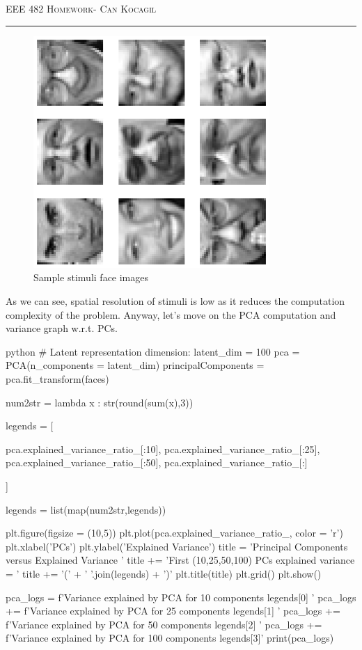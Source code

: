 \documentclass[12pt]{amsart}
\begin{document}
\newpage
{\scshape EEE 482} \hfill {\scshape \large  Homework-\relax} \hfill {\scshape Can Kocagil}
\smallskip
\hrule
\vspace{2mm}



\begin{figure}[h]
    \centering
        \includegraphics[width = 0.8\textwidth,angle=270,origin=c]{images/Q1/face_images.png}
        \caption{Sample stimuli face images}
\end{figure}

As we can see, spatial resolution of stimuli is low as it reduces the computation complexity of the problem. Anyway, let's move on the PCA computation and variance graph w.r.t. PCs.

\begin{mintedbox}{python}
# Latent representation dimension:
latent_dim = 100
pca = PCA(n_components = latent_dim)
principalComponents = pca.fit_transform(faces)

num2str = lambda x : str(round(sum(x),3))

legends = [

    pca.explained_variance_ratio_[:10],
    pca.explained_variance_ratio_[:25],
    pca.explained_variance_ratio_[:50],
    pca.explained_variance_ratio_[:]

]

legends = list(map(num2str,legends))

plt.figure(figsize = (10,5))
plt.plot(pca.explained_variance_ratio_, color = 'r')
plt.xlabel('PCs')
plt.ylabel('Explained Variance')
title = 'Principal Components versus Explained Variance \n'
title += 'First (10,25,50,100) PCs explained variance = '
title += '('  + ' '.join(legends) + ')'
plt.title(title)
plt.grid()
plt.show()

pca_logs = f'Variance explained by PCA for 10 components  {legends[0]} \n'
pca_logs += f'Variance explained by PCA for 25 components  {legends[1]} \n'
pca_logs += f'Variance explained by PCA for 50 components  {legends[2]} \n'
pca_logs += f'Variance explained by PCA for 100 components {legends[3]}'
print(pca_logs)

\end{mintedbox}
\end{document}
